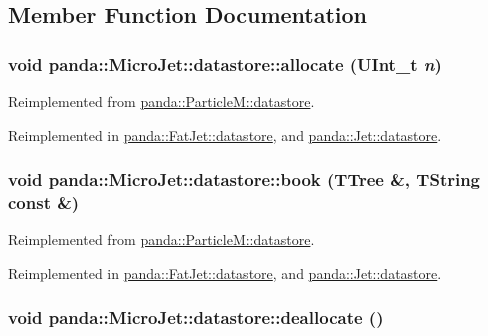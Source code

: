 \subsection{Member Function Documentation}
\hypertarget{structpanda_1_1MicroJet_1_1datastore_a09aae2ebbbda55c6616b6a693f43bb66}{
\subsubsection[{allocate}]{\setlength{\rightskip}{0pt plus 5cm}void panda::MicroJet::datastore::allocate (UInt\_\-t {\em n})}}
\label{structpanda_1_1MicroJet_1_1datastore_a09aae2ebbbda55c6616b6a693f43bb66}


Reimplemented from \hyperlink{structpanda_1_1ParticleM_1_1datastore_aafc17a88cf8425ff45a00b5fd2eb5751}{panda::ParticleM::datastore}.

Reimplemented in \hyperlink{structpanda_1_1FatJet_1_1datastore_a5df5d3f7ed3b3d1d70f99dcb6a9c25e4}{panda::FatJet::datastore}, and \hyperlink{structpanda_1_1Jet_1_1datastore_a899f59963d18c2c13019d9ed27eb7745}{panda::Jet::datastore}.\hypertarget{structpanda_1_1MicroJet_1_1datastore_a1a17e11396756ae30ac63c834cbe5976}{
\subsubsection[{book}]{\setlength{\rightskip}{0pt plus 5cm}void panda::MicroJet::datastore::book (TTree \&, \/  TString const \&)}}
\label{structpanda_1_1MicroJet_1_1datastore_a1a17e11396756ae30ac63c834cbe5976}


Reimplemented from \hyperlink{structpanda_1_1ParticleM_1_1datastore_ae2eb76ca042d8b3e899c027ee07b5860}{panda::ParticleM::datastore}.

Reimplemented in \hyperlink{structpanda_1_1FatJet_1_1datastore_abc4532c13b6be8b1feaf70e3504f5f59}{panda::FatJet::datastore}, and \hyperlink{structpanda_1_1Jet_1_1datastore_a6b3a8bbeb4fa9c002c5eebbd97962095}{panda::Jet::datastore}.\hypertarget{structpanda_1_1MicroJet_1_1datastore_a03473e3dcba5abe73c123ce2c1d3292c}{
\subsubsection[{deallocate}]{\setlength{\rightskip}{0pt plus 5cm}void panda::MicroJet::datastore::deallocate ()}}
\label{structpanda_1_1MicroJet_1_1datastore_a03473e3dcba5abe73c123ce2c1d3292c}


